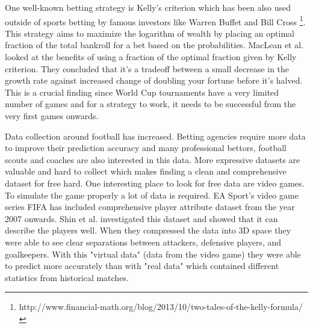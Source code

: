 One well-known betting strategy is Kelly's criterion which has been also used outside of sports betting by famous investors like Warren Buffet and Bill Cross \footnote{http://www.financial-math.org/blog/2013/10/two-tales-of-the-kelly-formula/}. This strategy aims to maximize the logarithm of wealth by placing an optimal fraction of the total bankroll for a bet based on the probabilities. MacLean et al. \cite{maclean1992growth} looked at the benefits of using a fraction of the optimal fraction given by Kelly criterion. They concluded that it's a tradeoff between a small decrease in the growth rate against increased change of doubling your fortune before it's halved. This is a crucial finding since World Cup tournaments have a very limited number of games and for a strategy to work, it needs to be successful from the very first games onwards.

Data collection around football has increased. Betting agencies require more data to improve their prediction accuracy and many professional bettors, football scouts and coaches are also interested in this data. More expressive datasets are valuable and hard to collect which makes finding a clean and comprehensive dataset for free hard. One interesting place to look for free data are video games. To simulate the game properly a lot of data is required. EA Sport's video game series FIFA has included comprehensive player attribute dataset from the year 2007 onwards. Shin et al. \cite{shin2014novel} investigated this dataset and showed that it can describe the players well. When they compressed the data into 3D space they were able to see clear separations between attackers, defensive players, and goalkeepers. With this "virtual data" (data from the video game) they were able to predict more accurately than with "real data" which contained different statistics from historical matches.

